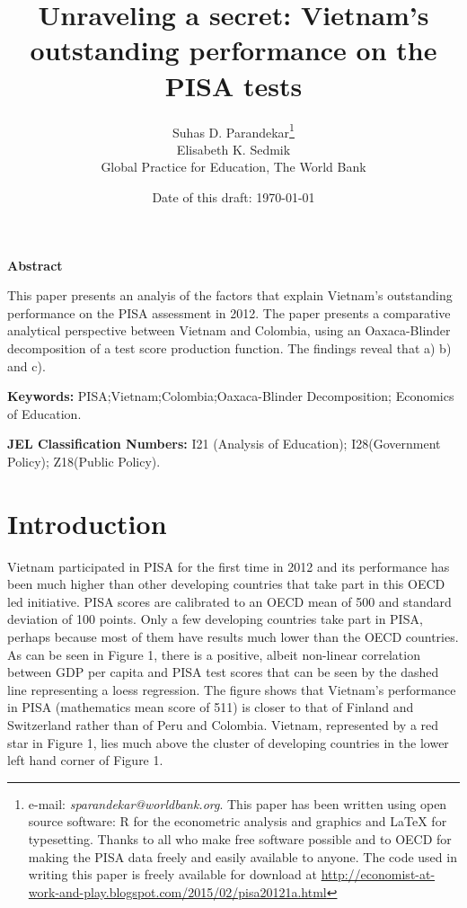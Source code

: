 \documentclass[12pt]{article}%
\begin{document}
\title{Unraveling a secret: Vietnam's outstanding performance on the PISA tests}
\author{Suhas D. Parandekar\thanks{e-mail: \textit{sparandekar@worldbank.org}. This paper has been written using open source software: R for the econometric analysis and graphics and LaTeX for typesetting. Thanks to all who make free software possible and to OECD for making the PISA data freely and easily available to anyone. The code used in writing this paper is freely available for download at \href{http://economist-at-work-and-play.blogspot.com/2015/02/pisa20121a.html}{http://economist-at-work-and-play.blogspot.com/2015/02/pisa20121a.html}}\\Elisabeth K. Sedmik\medskip\\{\normalsize Global Practice for Education, The World Bank} 
\date{\normalsize Date of this draft: \today }}
\maketitle

\sloppy

\singlespacing

\textbf{Abstract}

This paper presents an analyis of the factors that explain Vietnam's outstanding performance on the PISA assessment in 2012. The paper presents a comparative analytical perspective between Vietnam and Colombia, using an Oaxaca-Blinder decomposition of a test score production function. The findings reveal that a) b) and c). 

\strut

\textbf{Keywords:} PISA;Vietnam;Colombia;Oaxaca-Blinder Decomposition; Economics of Education.

\strut

\textbf{JEL Classification Numbers:} I21 (Analysis of Education); I28(Government Policy); Z18(Public Policy).

\thispagestyle{empty}

\pagebreak%
\onehalfspacing

\section{Introduction}
Vietnam participated in PISA for the first time in 2012 and its performance has been much higher than other developing countries that take part in this OECD led initiative. PISA scores are calibrated to an OECD mean of 500 and standard deviation of 100 points. Only a few developing countries take part in PISA, perhaps because most of them have results much lower than the OECD countries. As can be seen in Figure 1, there is a positive, albeit non-linear correlation between GDP per capita and PISA test scores that can be seen by the dashed line representing a loess regression. The figure shows that Vietnam's performance in PISA (mathematics mean score of 511) is closer to that of Finland and Switzerland rather than of Peru and Colombia. Vietnam, represented by a red star in Figure 1, lies much above the cluster of developing countries in the lower left hand corner of Figure 1.  
\end{document}
